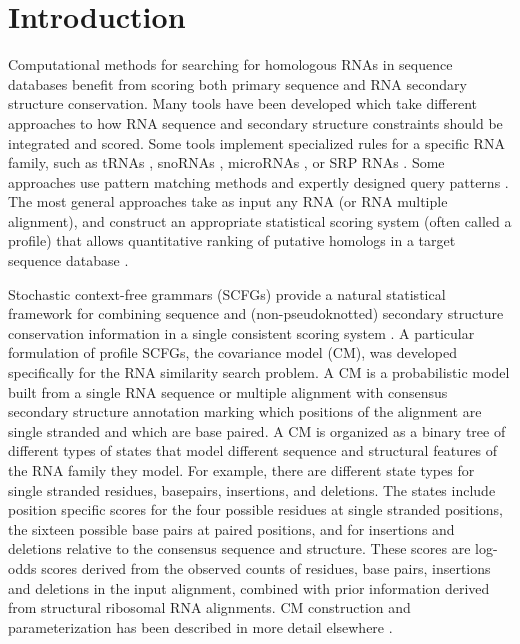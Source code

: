 \section{Introduction}

Computational methods for searching for homologous RNAs in sequence databases
benefit from scoring both primary sequence and RNA secondary structure
conservation. Many tools have been developed which take different
approaches to how RNA sequence and secondary structure constraints
should be integrated and scored. Some tools implement specialized
rules for a specific RNA family, such as tRNAs
\citep{LoweEddy97,Laslett04}, snoRNAs \citep{LoweEddy99,Schattner06},
microRNAs \citep{Lai03,Lim03}, or SRP RNAs \citep{Lai03,Lim03}. Some
approaches use pattern matching methods and expertly designed query
patterns \citep{Macke01}. The most general approaches take as input
any RNA (or RNA multiple alignment), and construct an appropriate
statistical scoring system (often called a profile) that allows
quantitative ranking of putative homologs in a target sequence
database \citep{Gautheret01,ZhangBafna05,Huang08}.

Stochastic context-free grammars (SCFGs) provide a natural statistical
framework for combining sequence and (non-pseudoknotted) secondary
structure conservation information in a single consistent scoring
system \citep{Sakakibara94c,Eddy94,Brown00,Durbin98}. A particular
formulation of profile SCFGs, the covariance model (CM), was developed
specifically for the RNA similarity search problem.  A CM is a
probabilistic model built from a single RNA sequence or multiple
alignment with consensus secondary structure annotation marking which
positions of the alignment are single stranded and which are base
paired. 
A CM is organized as a binary tree of different types of states that
model different sequence and structural features of the RNA family
they model. For example, there are different state types for single
stranded residues, basepairs, insertions, and deletions.  The states
include position specific scores for the four possible residues at
single stranded positions, the sixteen possible base pairs at paired
positions, and for insertions and deletions relative to the consensus
sequence and structure.  These scores are log-odds scores derived from
the observed counts of residues, base pairs, insertions and deletions
in the input alignment, combined with prior information derived from
structural ribosomal RNA alignments.  CM construction and
parameterization has been described in more detail elsewhere
\citep{Eddy94,Eddy02b,infguide03,NawrockiEddy07}.  


